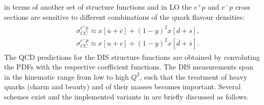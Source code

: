 in terms of another set of structure functions and in LO the $e^+p$ and $e^-p$ cross sections are sensitive to 
different combinations of the quark flavour densities:
\begin{eqnarray}
    \begin{array}{rll}
     & & \sigma_{CC}^{e^{+} p} \approx 
        x [\overline u + \overline c] + (1-y)^2 x [d+s], \\
     & & \sigma_{CC}^{e^{-} p} \approx 
        x[u+c] + (1-y)^2 x[\overline d + \overline s].
    \end{array}
\end{eqnarray}
%
The QCD predictions for the DIS structure functions are obtained by convoluting 
the PDFs with the respective coefficient functions. The DIS measurements span in the kinematic range from low to high $Q^2$, such that  
the treatment of heavy quarks (charm and beauty) and of their masses becomes important. 
Several schemes exist and the implemented variants in \fitter are briefly discussed as follows.


